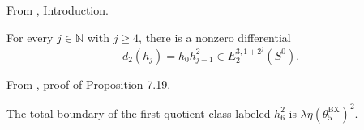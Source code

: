 \begin{theorem}
\label{frontier:Literature:75582be1124c}
From \cite{LWX126}, Introduction.\par

For every $j\in\mathbb N$ with $j\ge4$, there is a nonzero differential\[d_2(h_j)=h_0h_{j-1}^2\in E_2^{3,1+2^j}(S^0).\]
\end{theorem}

\begin{theorem}
\label{frontier:Literature:86d633a93ab1}
From \cite{BurklundXu}, proof of Proposition 7.19.\par

The total boundary of the first-quotient class labeled $h_6^2$ is $\lambda\eta(\theta_5^{\mathrm{BX}})^2$.
\end{theorem}

